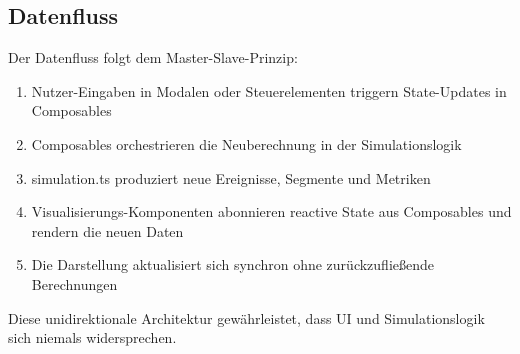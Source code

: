 \subsection*{Datenfluss}

Der Datenfluss folgt dem Master-Slave-Prinzip:
\begin{enumerate}
    \item Nutzer-Eingaben in Modalen oder Steuerelementen triggern State-Updates in Composables
    \item Composables orchestrieren die Neuberechnung in der Simulationslogik
    \item simulation.ts produziert neue Ereignisse, Segmente und Metriken
    \item Visualisierungs-Komponenten abonnieren reactive State aus Composables und rendern die neuen Daten
    \item Die Darstellung aktualisiert sich synchron ohne zurückzufließende Berechnungen
\end{enumerate}

Diese unidirektionale Architektur gewährleistet, dass UI und Simulationslogik sich niemals widersprechen.
